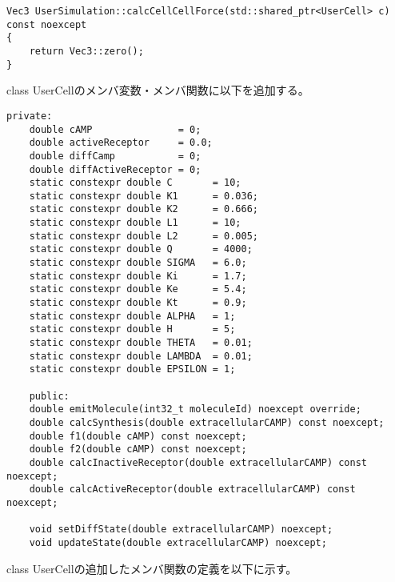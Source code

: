 \documentclass[vipdfmx,a4paper,11pt]{jsarticle}
\begin{document}
\begin{lstlisting}[caption=calcCellCellForce()]
Vec3 UserSimulation::calcCellCellForce(std::shared_ptr<UserCell> c) const noexcept
{
    return Vec3::zero();
}
\end{lstlisting}

class UserCellのメンバ変数・メンバ関数に以下を追加する。

\begin{lstlisting}[caption=class UserCell(UserCell.hpp)]
    private:
    double cAMP               = 0;
    double activeReceptor     = 0.0;
    double diffCamp           = 0;
    double diffActiveReceptor = 0;
    static constexpr double C       = 10;
    static constexpr double K1      = 0.036;
    static constexpr double K2      = 0.666;
    static constexpr double L1      = 10;
    static constexpr double L2      = 0.005;
    static constexpr double Q       = 4000;
    static constexpr double SIGMA   = 6.0;
    static constexpr double Ki      = 1.7;
    static constexpr double Ke      = 5.4;
    static constexpr double Kt      = 0.9;
    static constexpr double ALPHA   = 1;
    static constexpr double H       = 5;
    static constexpr double THETA   = 0.01;
    static constexpr double LAMBDA  = 0.01;
    static constexpr double EPSILON = 1;

    public:
    double emitMolecule(int32_t moleculeId) noexcept override;
    double calcSynthesis(double extracellularCAMP) const noexcept;
    double f1(double cAMP) const noexcept;
    double f2(double cAMP) const noexcept;
    double calcInactiveReceptor(double extracellularCAMP) const noexcept;
    double calcActiveReceptor(double extracellularCAMP) const noexcept;

    void setDiffState(double extracellularCAMP) noexcept;
    void updateState(double extracellularCAMP) noexcept;
\end{lstlisting}

class UserCellの追加したメンバ関数の定義を以下に示す。
\end{document}

